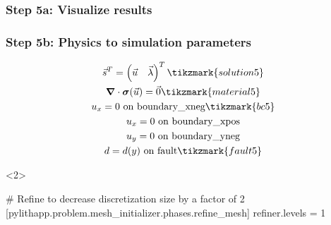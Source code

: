 \documentclass[aspectratio=169]{beamer}
\begin{document}
\begin{frame}
  \frametitle{Step 5a: Visualize results}

    
\end{frame}


\begin{frame}[t,fragile]
  \frametitle{Step 5b: Physics to simulation parameters}
  \summary{}

  \begin{minipage}[t]{0.3\textwidth}
    {\scriptsize
    \begin{gather*}
    \vec{s}^T = \left( \vec{u} \quad \vec{\lambda} \right)^T \tikzmark{solution5}\\
    \tensor{\nabla} \cdot \tensor{\sigma}(\vec{u}) = \vec{0} \tikzmark{material5}\\
    u_x = 0 \text{ on boundary\_xneg} \tikzmark{bc5}\\
    u_x = 0 \text{ on boundary\_xpos} \\
    u_y = 0 \text{ on boundary\_yneg} \\
    d = d(y) \text{ on fault} \tikzmark{fault5}
    \end{gather*}}
  \end{minipage}
  \hfill
  \begin{minipage}[t]{0.67\textwidth}
    \begin{onlyenv}<2>
      \begin{cfgcode}
        # Refine to decrease discretization size by a factor of 2
        [pylithapp.problem.mesh_initializer.phases.refine_mesh]
        refiner.levels = 1
      \end{cfgcode}
    \end{onlyenv}
  \end{minipage}

  
\end{frame}
\end{document}
